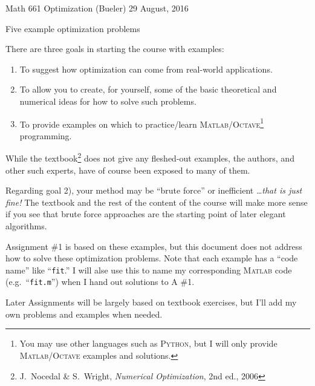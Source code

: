 \documentclass[11pt]{amsart}
\newcommand{\Matlab}{\textsc{Matlab}\xspace}
\newcommand{\Octave}{\textsc{Octave}\xspace}
\newcommand{\Python}{\textsc{Python}\xspace}
\begin{document}
\scriptsize \noindent Math 661 Optimization (Bueler) \hfill 29 August, 2016
\normalsize

\medskip\bigskip
\Large
\centerline{Five example optimization problems}

\bigskip\medskip
\normalsize

\thispagestyle{empty}

There are three goals in starting the course with examples:
\renewcommand{\labelenumi}{\arabic{enumi})}
\begin{enumerate}
\item To suggest how optimization can come from real-world applications.
\item To allow you to create, for yourself, some of the basic theoretical and numerical ideas for how to solve such problems.
\item To provide examples on which to practice/learn \Matlab/\Octave\footnote{You may use other languages such as \Python, but I will only provide \Matlab/\Octave examples and solutions.} programming.
\end{enumerate}
While the textbook\footnote{J.~Nocedal \& S.~Wright, \emph{Numerical Optimization}, 2nd ed., 2006} does not give any fleshed-out examples, the authors, and other such experts, have of course been exposed to many of them.

Regarding goal 2), your method may be ``brute force'' or inefficient \dots \emph{that is just fine!}  The textbook and the rest of the content of the course will make more sense if you see that brute force approaches are the starting point of later elegant algorithms.

Assignment \#1 is based on these examples, but this document does not address how to solve these optimization problems.  Note that each example has a ``code name'' like ``\texttt{fit}.''  I will alse use this to name my corresponding \Matlab code (e.g.~``\texttt{fit.m}'') when I hand out solutions to A \#1.

Later Assignments will be largely based on textbook exercises, but I'll add my own problems and examples when needed.
\end{document}
